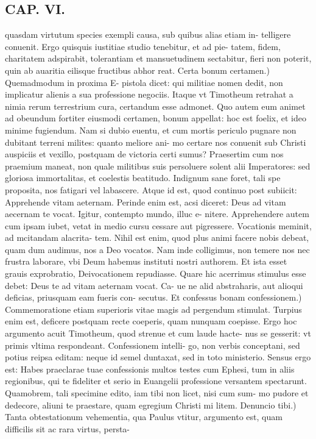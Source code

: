 \documentclass{article}
\begin{document}
\begin{pages}
\section*{CAP. VI. }
\marginpar{[ p.79 ]}\pstart quasdam virtutum species exempli causa, sub quibus alias etiam in- telligere conuenit. Ergo quisquis iustitiae studio tenebitur, et ad pie- tatem, fidem, charitatem adspirabit, tolerantiam et mansuetudinem sectabitur, fieri non poterit, quin ab auaritia eilisque fructibus abhor reat.  \pend\pstart Certa bonum certamen.) Quemadmodum in proxima E- pistola dicet: qui militiae nomen dedit, non implicatur alienis a sua professione negociis. Itaque vt Timotheum retrahat a nimia rerum terrestrium cura, certandum esse admonet. Quo autem eum animet ad obeundum fortiter eiusmodi certamen, bonum appellat: hoc est foelix, et ideo minime fugiendum. Nam si dubio euentu, et cum mortis periculo pugnare non dubitant terreni milites: quanto meliore ani- mo certare nos conuenit sub Christi auspiciis et vexillo, postquam de victoria certi sumus? Praesertim cum nos praemium maneat, non quale militibus suis persoluere solent alii Imperatores: sed gloriosa immortalitas, et coelestis beatitudo. Indignum sane foret, tali spe proposita, nos fatigari vel labascere. Atque id est, quod continuo post subiicit: Apprehende vitam aeternam. Perinde enim est, acsi diceret: Deus ad vitam aecernam te vocat. Igitur, contempto mundo, illuc e- nitere. Apprehendere autem cum ipsam iubet, vetat in medio cursu cessare aut pigressere. Vocationis meminit, ad mcitandam alacrita- tem. Nihil est enim, quod plus animi facere nobis debeat, quam dum audimus, nos a Deo vocatos. Nam inde colligimus, non temere nos nec frustra laborare, vbi Deum habemus instituti nostri authorem. Et ista esset grauis exprobratio, Deivocationem repudiasse. Quare hic acerrimus stimulus esse debet: Deus te ad vitam aeternam vocat. Ca- ue ne alid abstraharis, aut alioqui deficias, priusquam eam fueris con- secutus.  \pend\pstart Et confessus bonam confessionem.) Commemoratione etiam superioris vitae magis ad pergendum stimulat. Turpius enim est, deficere postquam recte coeperis, quam nunquam coepisse. Ergo hoc argumento acuit Timotheum, quod strenue et cum laude hacte- nus se gesserit: vt primis vltima respondeant. Confessionem intelli- go, non verbis conceptani, sed potius reipsa editam: neque id semel duntaxat, sed in toto ministerio. Sensus ergo est: Habes praeclarae tuae confessionis multos testes cum Ephesi, tum in aliis regionibus, qui te fideliter et serio in Euangelii professione versantem spectarunt. Quamobrem, tali specimine edito, iam tibi non licet, nisi cum sum- mo pudore et dedecore, aliuni te praestare, quam egregium Christi mi litem.  \pend\pstart Denuncio tibi.) Tanta obtestationum vehementia, qua Paulus vtitur, argumento est, quam difficilis sit ac rara virtus, persta-  \pend

\end{pages}
\end{document}
